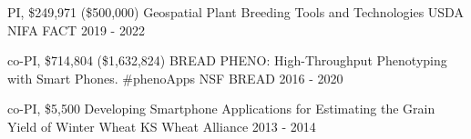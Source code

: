 \begin{cvgrants}
  \cvgrant
    {PI, \$249,971 (\$500,000)} %
    {Geospatial Plant Breeding Tools and Technologies}
    {USDA NIFA FACT} %
    {2019 - 2022}
    {
    }

  \cvgrant
    {co-PI, \$714,804 (\$1,632,824)} %
    {BREAD PHENO: High-Throughput Phenotyping with Smart Phones. \#phenoApps}
    {NSF BREAD} %
    {2016 - 2020}
    {
    }

  \cvgrant
    {co-PI, \$5,500} %
    {Developing Smartphone Applications for Estimating the Grain Yield of Winter Wheat}
    {KS Wheat Alliance}
    {2013 - 2014}
    {
    }

\end{cvgrants}
